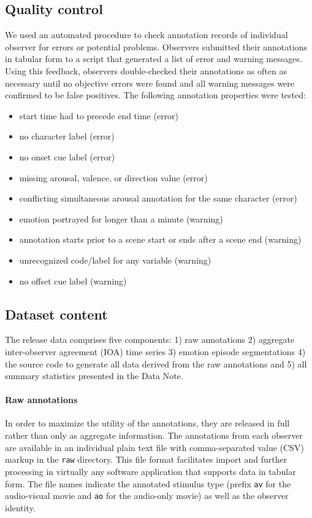 \documentclass[10pt,a4paper,twocolumn]{article}
\begin{document}
\subsection*{Quality control}

We used an automated procedure to check annotation records of individual
observer for errors or potential problems. Observers submitted their
annotations in tabular form to a script that generated a list of error and
warning messages. Using this feedback, observers double-checked their
annotations as often as necessary until no objective errors were found and all
warning messages were confirmed to be false positives. The following annotation
properties were tested:

\begin{itemize}
  \item start time had to precede end time (error)
  \item no character label (error)
  \item no onset cue label (error)
  \item missing arousal, valence, or direction value (error)
  \item conflicting simultaneous arousal annotation for the same character (error)
  \item emotion portrayed for longer than a minute (warning)
  \item annotation starts prior to a scene start or ends after a scene end
    (warning)
  \item unrecognized code/label for any variable (warning)
  \item no offset cue label (warning)
\end{itemize}

\subsection*{Dataset content}

The release data comprises five components: 1) raw annotations 2) aggregate
inter-observer agreement (IOA) time series 3) emotion episode segmentations 4)
the source code to generate all data derived from the raw annotations and 5) all
summary statistics presented in the Data Note.

\paragraph{Raw annotations} In order to maximize the utility of the annotations,
they are released in full rather than only as aggregate information. The
annotations from each observer are available in an individual plain text file
with comma-separated value (CSV) markup in the \texttt{raw} directory. This
file format facilitates import and further processing in virtually any software
application that supports data in tabular form. The file names indicate the
annotated stimulus type (prefix \texttt{av} for the audio-visual movie and
\texttt{ao} for the audio-only movie) as well as the observer identity.
\end{document}
